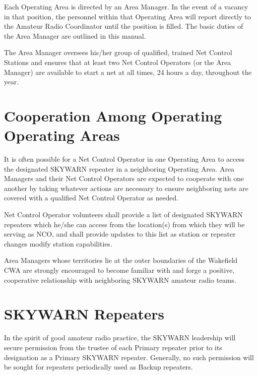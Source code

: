 \documentclass[pdflatex,letterpaper,twoside,12pt]{book}
\begin{document}
Each Operating Area is directed by an Area Manager.  In the event of a vacancy in that position, the personnel within that Operating Area will report directly to the Amateur Radio Coordinator until the position is filled.  The basic duties of the Area Manager are outlined in this manual. 

The Area Manager oversees his/her group of qualified, trained Net Control Stations and ensures that at least two Net Control Operators (or the Area Manager) are available to start a net at all times, 24 hours a day, throughout the year. 


\section{Cooperation Among Operating Operating Areas}

It is often possible for a Net Control Operator in one Operating Area to access the designated SKYWARN repeater in a neighboring Operating Area.  Area Managers and their Net Control Operators are expected to cooperate with one another by taking whatever actions are necessary to ensure neighboring nets are covered with a qualified Net Control Operator as needed. 

Net Control Operator volunteers shall provide a list of designated SKYWARN repeaters which he/she can access from the location(s) from which they will be serving as NCO, and shall provide updates to this list as station or repeater changes modify station capabilities. 

Area Managers whose territories lie at the outer boundaries of the Wakefield CWA are strongly encouraged to become familiar with and forge a positive, cooperative relationship with neighboring SKYWARN amateur radio teams.


\section{SKYWARN Repeaters}

In the spirit of good amateur radio practice, the SKYWARN leadership will secure permission from the trustee of each Primary repeater prior to its designation as a Primary SKYWARN repeater.  Generally, no such permission will be sought for repeaters periodically used as Backup repeaters. 
\end{document}
